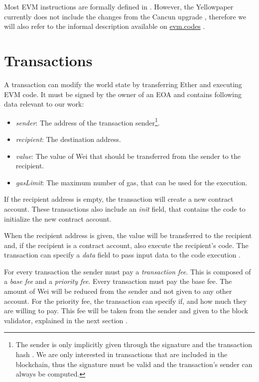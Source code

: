 \documentclass[draft,final]{vutinfth} %
\begin{document}
Most EVM instructions are formally defined in \cite[p.30-38]{wood_ethereum_2024}. However, the Yellowpaper currently does not include the changes from the Cancun upgrade \cite{noauthor_history_2024}, therefore we will also refer to the informal description available on \href{https://www.evm.codes/}{evm.codes} \cite{noauthor_evm_2024}.

\section{Transactions}

A transaction can modify the world state by transferring Ether and executing EVM code. It must be signed by the owner of an EOA and contains following data relevant to our work:

\begin{itemize}
    \item \emph{sender}: The address of the transaction sender\footnote{The sender is only implicitly given through the signature and the transaction hash \cite[p.25-27]{wood_ethereum_2024}. We are only interested in transactions that are included in the blockchain, thus the signature must be valid and the transaction's sender can always be computed.}.
    \item \emph{recipient}: The destination address.
    \item \emph{value}: The value of Wei that should be transferred from the sender to the recipient.
    \item \emph{gasLimit}: The maximum number of gas, that can be used for the execution.
\end{itemize}

If the recipient address is empty, the transaction will create a new contract account. These transactions also include an \emph{init} field, that contains the code to initialize the new contract account.

When the recipient address is given, the value will be transferred to the recipient and, if the recipient is a contract account, also execute the recipient's code. The transaction can specify a \emph{data} field to pass input data to the code execution \cite[p.4-5]{wood_ethereum_2024}.


For every transaction the sender must pay a \emph{transaction fee}. This is composed of a \emph{base fee} and a \emph{priority fee}. Every transaction must pay the base fee. The amount of Wei will be reduced from the sender and not given to any other account. For the priority fee, the transaction can specify if, and how much they are willing to pay. This fee will be taken from the sender and given to the block validator, explained in the next section \cite[p.8]{wood_ethereum_2024}.
\end{document}
